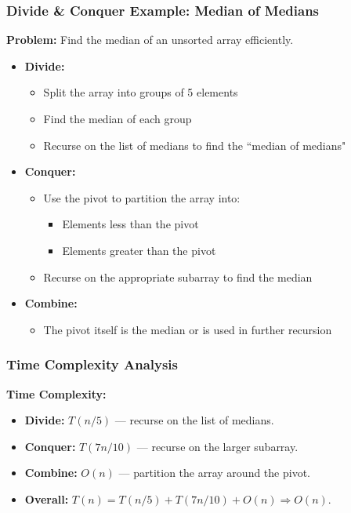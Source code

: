 \documentclass[10pt,aspectratio=43]{beamer}
\begin{document}
\begin{frame}
  \frametitle{Divide \& Conquer Example: Median of Medians}
  
  \textbf{Problem:} Find the median of an unsorted array efficiently.
  
  \begin{itemize}
      \item \textbf{Divide:}
      \begin{itemize}
          \item Split the array into groups of 5 elements
          \item Find the median of each group
          \item Recurse on the list of medians to find the ``median of medians"
      \end{itemize}
      \vspace{0.2cm}
      \item \textbf{Conquer:}
      \begin{itemize}
          \item Use the pivot to partition the array into:
          \begin{itemize}
              \item Elements less than the pivot
              \item Elements greater than the pivot
          \end{itemize}
          \item Recurse on the appropriate subarray to find the median
      \end{itemize}
      \vspace{0.2cm}
      \item \textbf{Combine:} 
      \begin{itemize}
          \item The pivot itself is the median or is used in further recursion
      \end{itemize}
  \end{itemize}
\end{frame}
\begin{frame}
  \frametitle{Time Complexity Analysis}

  \textbf{Time Complexity:}
  \begin{itemize}
      \item \textbf{Divide:} \(T(n/5)\) — recurse on the list of medians.
      \item \textbf{Conquer:} \(T(7n/10)\) — recurse on the larger subarray.
      \item \textbf{Combine:} \(O(n)\) — partition the array around the pivot.
      \item \textbf{Overall:} \(T(n) = T(n/5) + T(7n/10) + O(n) \Rightarrow O(n)\).
  \end{itemize}
\end{frame}
\end{document}
